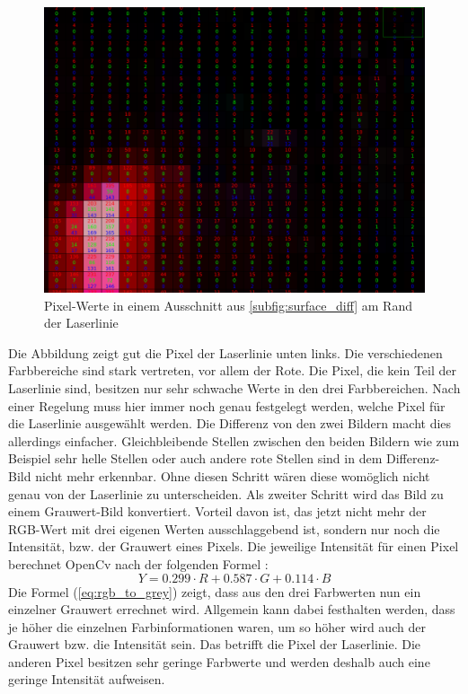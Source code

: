 	\begin{figure}[h]
		\centering
		\includegraphics[width=0.75\linewidth]{img/hauptteil/bildverarbeitung/pixel_values.png}
		\caption[Pixel-Werte der Laserlinie]{Pixel-Werte in einem Ausschnitt aus \ref{subfig:surface_diff} am Rand der Laserlinie}
		\label{fig:pix_values}
	\end{figure} 
	
	Die Abbildung zeigt gut die Pixel der Laserlinie unten links. Die verschiedenen Farbbereiche sind stark vertreten, vor allem der Rote. Die Pixel, die kein Teil der Laserlinie sind, besitzen nur sehr schwache Werte in den drei Farbbereichen. Nach einer Regelung muss hier immer noch genau festgelegt werden, welche Pixel für die Laserlinie ausgewählt werden. Die Differenz von den zwei Bildern macht dies allerdings einfacher. Gleichbleibende Stellen zwischen den beiden Bildern wie zum Beispiel sehr helle Stellen oder auch andere rote Stellen sind in dem Differenz-Bild nicht mehr erkennbar. Ohne diesen Schritt wären diese womöglich nicht genau von der Laserlinie zu unterscheiden. \newline
	Als zweiter Schritt wird das Bild zu einem Grauwert-Bild konvertiert. Vorteil davon ist, das jetzt nicht mehr der RGB-Wert mit drei eigenen Werten ausschlaggebend ist, sondern nur noch die Intensität, bzw. der Grauwert eines Pixels. Die jeweilige Intensität für einen Pixel berechnet OpenCv nach der folgenden Formel \cite[Vgl.][]{noauthor_opencv_nodate}:
	\begin{equation}
	Y = 0.299 \cdot R + 0.587 \cdot G + 0.114 \cdot B
	\label{eq:rgb_to_grey}
	\end{equation}
	Die Formel (\ref{eq:rgb_to_grey}) zeigt, dass aus den drei Farbwerten nun ein einzelner Grauwert errechnet wird. Allgemein kann dabei festhalten werden, dass je höher die einzelnen Farbinformationen waren, um so höher wird auch der Grauwert bzw. die Intensität sein. Das betrifft die Pixel der Laserlinie. Die anderen Pixel besitzen sehr geringe Farbwerte und werden deshalb auch eine geringe Intensität aufweisen. 
	
